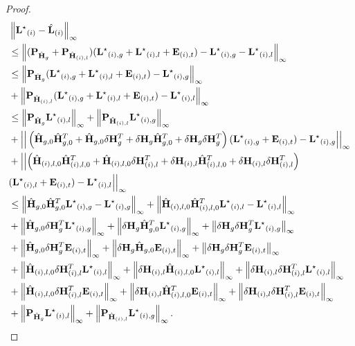 \documentclass[twoside,11pt]{article}
\newcommand{\norm}[1]{\left\lVert#1\right\rVert}
\newcommand{\matE}{\mathbf{E}}
\newcommand{\hmatH}{{\hat{\mathbf{H}}}{}}
\newcommand{\matLst}{{\mathbf{L}^\star}}
\newcommand{\matP}{\mathbf{P}}
\newcommand{\dtmatH}{\delta\mathbf{H}}
\newcommand{\hmatL}{\hat{\mathbf{L}}}
\begin{document}
\begin{proof}
\begin{align}
&\norm{\matLst_{(i)}- \hmatL_{(i)}}_{\infty}\notag\\
&\le \norm{(\matP_{\hmatH_g}+\matP_{\hmatH_{(i),l}})( \matLst_{(i),g}+\matLst_{(i),l}+\matE_{(i),t}) - \matLst_{(i),g}-\matLst_{(i),l} }_{\infty}\notag\\
&\le \norm{\matP_{\hmatH_g}( \matLst_{(i),g}+\matLst_{(i),l}+\matE_{(i),t})- \matLst_{(i),g}}_{\infty}\notag\\
&+\norm{\matP_{\hmatH_{(i),l}}( \matLst_{(i),g}+\matLst_{(i),l}+\matE_{(i),t})- \matLst_{(i),l}}_{\infty}\notag\\
&\le\norm{\matP_{\hmatH_g}\matLst_{(i),l} }_{\infty}+\norm{\matP_{\hmatH_{(i),l}}\matLst_{(i),g} }_{\infty}\notag\\
&+\Big|\Big|\left(\hmatH_{g,0}\hmatH_{g,0}^T+\hmatH_{g,0}\dtmatH_{g}^T+\dtmatH_{g}\hmatH_{g,0}^T+\dtmatH_{g}\dtmatH_{g}^T\right)(\matLst_{(i),g}+\matE_{(i),t})-\matLst_{(i),g} \Big|\Big|_{\infty}\notag\\
&+\Big|\Big|\Big(\hmatH_{(i),l,0}\hmatH_{(i),l,0}^T+\hmatH_{(i),l,0}\dtmatH_{(i),l}^T+\dtmatH_{(i),l}\hmatH_{(i),l,0}^T+\dtmatH_{(i),l}\dtmatH_{(i),l}^T\Big)\notag\\
&(\matLst_{(i),l}+\matE_{(i),t})-\matLst_{(i),l} \Big|\Big|_{\infty}\notag\\
&\le \norm{\hmatH_{g,0}\hmatH_{g,0}^T\matLst_{(i),g}-\matLst_{(i),g}}_{\infty}+\norm{\hmatH_{(i),l,0}\hmatH_{(i),l,0}^T\matLst_{(i),l}-\matLst_{(i),l}}_{\infty}\notag\\
&+\norm{\hmatH_{g,0}\dtmatH_g^T\matLst_{(i),g}}_{\infty}+\norm{\dtmatH_g\hmatH_{g,0}^T\matLst_{(i),g}}_{\infty}+\norm{\dtmatH_g\dtmatH_g^T\matLst_{(i),g}}_{\infty}\notag\\
&+\norm{\hmatH_{g,0}\dtmatH_g^T\matE_{(i),t}}_{\infty}+\norm{\dtmatH_g\hmatH_{g,0}\matE_{(i),t}}_{\infty}+\norm{\dtmatH_g\dtmatH_g^T\matE_{(i),t}}_{\infty}\notag\\
&+\norm{\hmatH_{(i),l,0}\dtmatH_{(i),l}^T\matLst_{(i),l}}_{\infty}+\norm{\dtmatH_{(i),l}\hmatH_{(i),l,0}\matLst_{(i),l}}_{\infty}+\norm{\dtmatH_{(i),l}\dtmatH_{(i),l}^T\matLst_{(i),l}}_{\infty}\notag\\
&+\norm{\hmatH_{(i),l,0}\dtmatH_{(i),l}^T\matE_{(i),t}}_{\infty}+\norm{\dtmatH_{(i),l}\hmatH_{(i),l,0}^T\matE_{(i),t}}_{\infty}+\norm{\dtmatH_{(i),l}\dtmatH_{(i),l}^T\matE_{(i),t}}_{\infty}\notag\\
&+\norm{\matP_{\hmatH_g}\matLst_{(i),l} }_{\infty}+\norm{\matP_{\hmatH_{(i),l}}\matLst_{(i),g} }_{\infty}.\notag\\
\label{eqn:sketch}
\end{align}


\end{proof}
\end{document}
